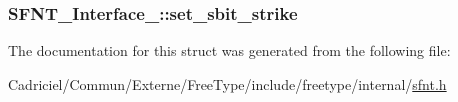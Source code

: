 \hypertarget{struct_s_f_n_t___interface___ab9e73d79753ea4a492c1cf66aee8e518}{
\subsubsection[{set\-\_\-sbit\-\_\-strike}]{ S\-F\-N\-T\-\_\-\-Interface\-\_\-\-::set\-\_\-sbit\-\_\-strike}}\label{struct_s_f_n_t___interface___ab9e73d79753ea4a492c1cf66aee8e518}


The documentation for this struct was generated from the following file\-:\begin{DoxyCompactItemize}
\item 
Cadriciel/\-Commun/\-Externe/\-Free\-Type/include/freetype/internal/\hyperlink{sfnt_8h}{sfnt.\-h}\end{DoxyCompactItemize}
